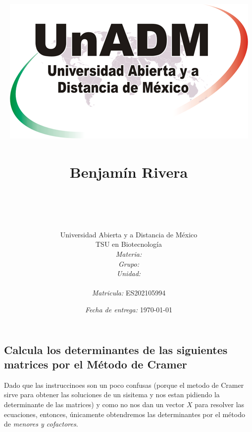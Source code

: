 \documentclass[12pt]{article}
\title{
	\includegraphics{../../../assets/logo-unadm} \\
	\ \\ Benjam\'in Rivera \\
	\bf{\titulo}\\\ \\}
\author{
	Universidad Abierta y a Distancia de México \\
	TSU en Biotecnolog\'ia \\
	\textit{Materia:} \materia \\
	\textit{Grupo:} \grupo \\
	\textit{Unidad:} \unidad \\
	\\
	\textit{Matricula:} ES202105994 }
\date{\textit{Fecha de entrega:} \today}
\begin{document}
\maketitle\newpage

\subsection*{Calcula los determinantes de las siguientes matrices por el Método de Cramer}

	\par Dado que las instruccinoes son un poco confusas (porque el metodo de Cramer sirve para obtener las soluciones de un sisitema y nos estan pidiendo la determinante de las matrices) y como no nos dan un vector $X$ para resolver las ecuaciones, entonces, \'unicamente obtendremos las determinantes por el m\'etodo de \textit{menores y cofactores}.
\end{document}
